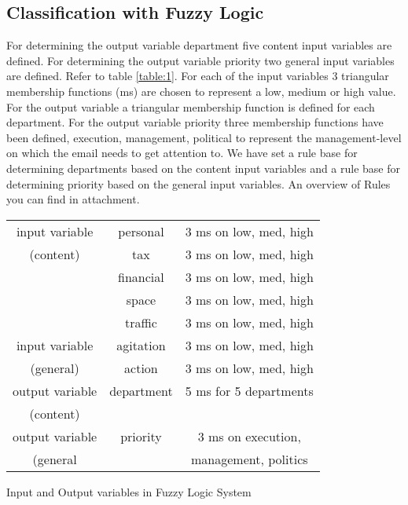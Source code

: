 \documentclass[journal]{IEEEtran}
\begin{document}
\subsection{Classification with Fuzzy Logic}
    
For determining the output variable department five content input variables are defined. For determining the output variable priority two general input variables are defined. Refer to table \ref{table:1}. For each of the input variables 3 triangular membership functions (ms) are chosen to represent a low, medium or high value. For the output variable a triangular membership function is defined for each department. For the output variable priority three membership functions have been defined, execution, management, political to represent the management-level on which the email needs to get attention to.  We have set a rule base for determining departments based on the content input variables and a rule base for determining priority based on the general input variables. An overview of Rules you can find in attachment. \\

\begin{center}
\begin{tabular}{ |c|c|c| } 
 \hline
 input variable     & personal  & 3 ms on low, med, high    \\ 
 (content)          & tax       & 3 ms on low, med, high    \\ 
                    & financial & 3 ms on low, med, high    \\ 
                    & space     & 3 ms on low, med, high    \\
                    & traffic   & 3 ms on low, med, high    \\ 
 input variable     & agitation & 3 ms on low, med, high    \\
 (general)          & action    & 3 ms on low, med, high    \\
 output variable    & department & 5 ms for 5 departments   \\
 (content)          &           &                           \\  
 output variable    & priority  & 3 ms on execution,        \\    
 (general           &           & management, politics      \\
 
\hline
\end{tabular}
\label{table:1}
Input and Output variables in Fuzzy Logic System
\end{center}
\end{document}
